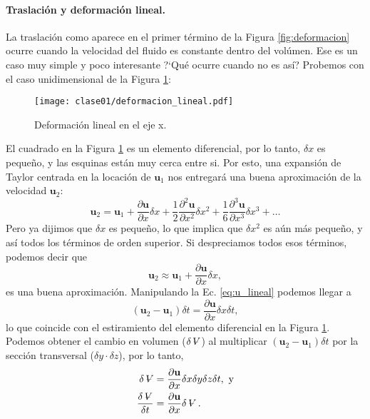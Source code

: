 \paragraph{Traslación y deformación lineal.}
La traslación como aparece en el primer término de la Figura \ref{fig:deformacion} ocurre cuando la velocidad del fluido es constante dentro del volúmen.
Ese es un caso muy simple y poco interesante 
\mbox{?`}Qué ocurre cuando no es así? 
Probemos con el caso unidimensional de la Figura \ref{fig:deformacion_lineal}:
%
\begin{figure}[h!]
\centering
\texttt{[image: clase01/deformacion\_lineal.pdf]}
\caption{Deformación lineal en el eje x.}
\label{fig:deformacion_lineal}
\end{figure}

El cuadrado en la Figura \ref{fig:deformacion_lineal} es un elemento diferencial, por lo tanto, $\delta x$ es pequeño, y las esquinas están muy cerca entre si.
Por esto, una expansión de Taylor centrada en la locación de $\mathbf{u}_1$ nos entregará una buena aproximación de la velocidad $\mathbf{u}_2$:
%
\begin{equation}
\mathbf{u}_2 = \mathbf{u}_1 + \frac{\partial \mathbf{u}}{\partial x}\delta x + \frac{1}{2}\frac{\partial^2 \mathbf{u}}{\partial x^2}\delta x^2 + \frac{1}{6}\frac{\partial^3 \mathbf{u}}{\partial x^3}\delta x^3 + \dots
\end{equation}
%
Pero ya dijimos que $\delta x$ es pequeño, lo que implica que $\delta x^2$ es aún más pequeño, y así todos los términos de orden superior.
Si despreciamos todos esos términos, podemos decir que
%
\begin{equation}\label{eq:u_lineal}
\mathbf{u}_2 \approx \mathbf{u}_1 + \frac{\partial \mathbf{u}}{\partial x}\delta x,
\end{equation}
%
es una buena aproximación.
Manipulando la Ec. \eqref{eq:u_lineal} podemos llegar a
%
\begin{equation}
(\mathbf{u}_2-\mathbf{u}_1)\delta t=\frac{\partial \mathbf{u}}{\partial x}\delta x\delta t,
\end{equation}
%
lo que coincide con el estiramiento del elemento diferencial en la Figura \ref{fig:deformacion_lineal}.
Podemos obtener el cambio en volumen ($\delta \vol$) al multiplicar $(\mathbf{u}_2-\mathbf{u}_1)\delta t$ por la sección transversal ($\delta y\cdot \delta z$), por lo tanto,
%
\begin{align}
\delta \vol &= \frac{\partial \mathbf{u}}{\partial x} \delta x\delta y\delta z\delta t, \text{ y} \nonumber \\
\frac{\delta \vol}{\delta t} &= \frac{\partial \mathbf{u}}{\partial x}\delta \vol.
\end{align}
